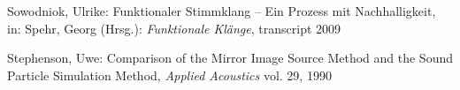 \begin{thebibliography}{}
Sowodniok, Ulrike: 
\glqq Funktionaler Stimmklang -- Ein Prozess mit Nachhalligkeit\grqq, 
in: Spehr, Georg (Hrsg.): \emph{Funktionale Klänge}, transcript 2009

Stephenson, Uwe: 
\glqq Comparison of the Mirror Image Source Method and the Sound Particle Simulation Method\grqq, 
\emph{Applied Acoustics} vol. 29, 1990


\end{thebibliography}

\clearpage\thispagestyle{empty}
\eigen  %













